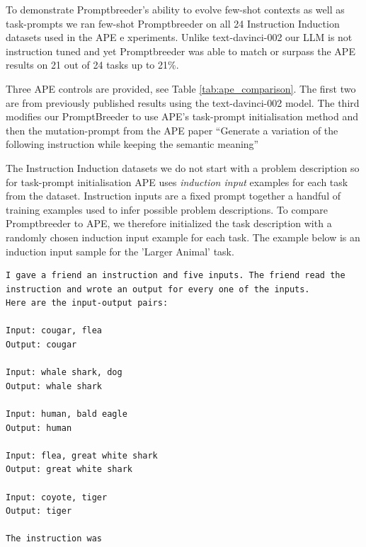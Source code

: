 \documentclass{article} %
\begin{document}
To demonstrate Promptbreeder's ability to evolve few-shot contexts as well as task-prompts we ran few-shot Promptbreeder on all 24 Instruction Induction datasets used in the APE e
xperiments. Unlike text-davinci-002 our LLM is not instruction tuned and yet Promptbreeder was able to match or surpass the APE results on 21 out of 24 tasks up to 21\%. 

Three APE controls are provided, see Table \ref{tab:ape_comparison}. The first two are from previously published results using the text-davinci-002 model. The third modifies our PromptBreeder to use APE’s task-prompt initialisation method and then the mutation-prompt from the APE paper ``Generate a variation of the following instruction while keeping the semantic meaning''

The Instruction Induction datasets we do not start with a problem description so for task-prompt initialisation APE uses \textit{induction input} examples for each task from the dataset. Instruction inputs are a fixed prompt together a handful of training examples used to infer possible problem descriptions. To compare Promptbreeder to APE, we therefore initialized the task description with a randomly chosen induction input example for each task. The example below is an induction input sample for the ’Larger Animal’ task.


\label{appendix:induction}
\begin{verbatim}
I gave a friend an instruction and five inputs. The friend read the 
instruction and wrote an output for every one of the inputs.
Here are the input-output pairs:
 
Input: cougar, flea
Output: cougar
 
Input: whale shark, dog
Output: whale shark
 
Input: human, bald eagle
Output: human
 
Input: flea, great white shark
Output: great white shark
 
Input: coyote, tiger
Output: tiger
 
The instruction was
\end{verbatim} 
\end{document}
